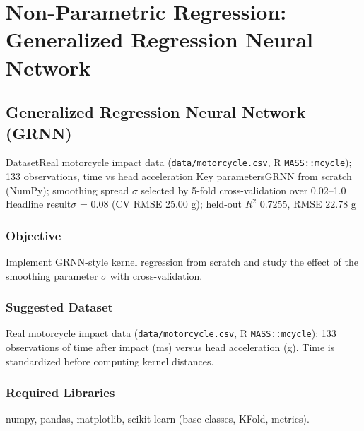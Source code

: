 
\part{Non-Parametric Regression: Generalized Regression Neural Network}

\chapter{Generalized Regression Neural Network (GRNN)}\label{exp:19}


\quickfacts
  {Dataset}{Real motorcycle impact data (\texttt{data/motorcycle.csv}, R \texttt{MASS::mcycle}); 133 observations, time vs head acceleration}
  {Key parameters}{GRNN from scratch (NumPy); smoothing spread $\sigma$ selected by 5-fold cross-validation over 0.02--1.0}
  {Headline result}{$\sigma$ = 0.08 (CV RMSE 25.00 g); held-out $R^2$ 0.7255, RMSE 22.78 g}

\section{Objective}
Implement GRNN-style kernel regression from scratch and study the effect of the smoothing
parameter $\sigma$ with cross-validation.

\section{Suggested Dataset}
Real motorcycle impact data (\texttt{data/motorcycle.csv}, R \texttt{MASS::mcycle}):
133 observations of time after impact (ms) versus head acceleration (g). Time is
standardized before computing kernel distances.

\section{Required Libraries}
numpy, pandas, matplotlib, scikit-learn (base classes, KFold, metrics).

